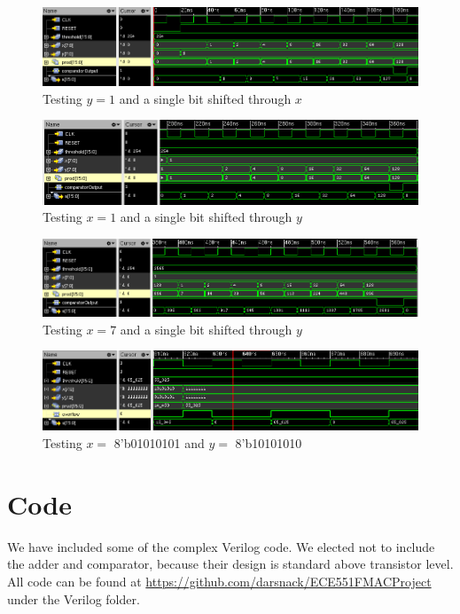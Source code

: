 \documentclass{memo}
\begin{document}
\begin{figure}[ht]
    \centering
    \includegraphics[scale=0.8]{testcase1.png}
    \caption{Testing $y = 1$ and a single bit shifted through $x$}
    \label{fig:testcase1}
\end{figure}
\begin{figure}[ht]
    \centering
    \includegraphics{testcase2.png}
    \caption{Testing $x = 1$ and a single bit shifted through $y$}
    \label{fig:testcase2}
\end{figure}
\begin{figure}[ht]
    \centering
    \includegraphics[scale=0.8]{testcase3.png}
    \caption{Testing $x = 7$ and a single bit shifted through $y$}
    \label{fig:testcase3}
\end{figure}
\begin{figure}[ht]
    \centering
    \includegraphics[scale=0.9]{testcase4.png}
    \caption{Testing $x =$ 8'b01010101 and $y =$ 8'b10101010}
    \label{fig:testcase4}
\end{figure}

\newpage
\section{Code}
We have included some of the complex Verilog code. We elected not to include the adder and comparator, because their design is standard above transistor level. All code can be found at \url{https://github.com/darsnack/ECE551FMACProject} under the Verilog folder.
\end{document}
